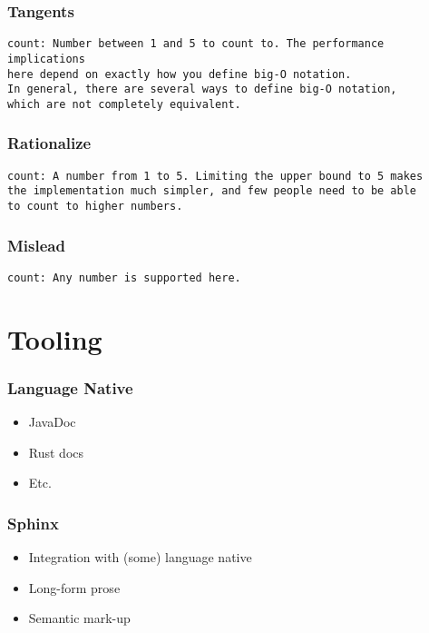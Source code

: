 \begin{frame}[fragile]
\frametitle{Tangents}

\begin{lstlisting}
count: Number between 1 and 5 to count to. The performance implications
here depend on exactly how you define big-O notation.
In general, there are several ways to define big-O notation,
which are not completely equivalent.
\end{lstlisting}

\end{frame}

\begin{frame}[fragile]
\frametitle{Rationalize}
\begin{lstlisting}
count: A number from 1 to 5. Limiting the upper bound to 5 makes
the implementation much simpler, and few people need to be able
to count to higher numbers.
\end{lstlisting}

\end{frame}

\begin{frame}[fragile]
\frametitle{Mislead}

\begin{lstlisting}
count: Any number is supported here.
\end{lstlisting}
\end{frame}

\section{Tooling}

\begin{frame}
\frametitle{Language Native}

\begin{itemize}
\item JavaDoc
\item Rust docs
\item Etc.
\end{itemize}

\end{frame}

\begin{frame}
\frametitle{Sphinx}

\begin{itemize}
\item Integration with (some) language native
\item Long-form prose
\item Semantic mark-up
\end{itemize}

\end{frame}

